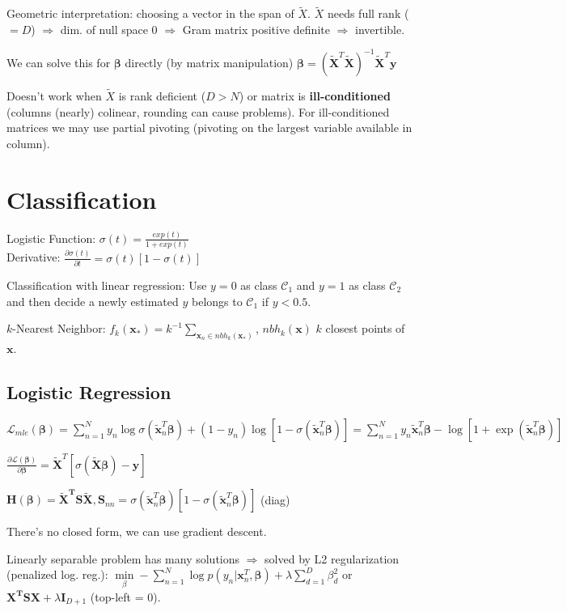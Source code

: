 \documentclass[10pt,a4paper,landscape]{extarticle}
\renewcommand{\bf}[1]{\ensuremath{\mathbf{#1}}}
\newcommand{\bbeta}{\boldsymbol\beta}
\begin{document}
\begin{multicols*}{4}
Geometric interpretation: choosing a vector in the span of $\tilde{X}$. $\tilde{X}$ needs full rank ($=D$) $\Rightarrow$ dim. of null space 0 $\Rightarrow$ Gram matrix positive definite $\Rightarrow$ invertible.

We can solve this for $\bbeta$ directly (by matrix manipulation)
$\bbeta = ( \bf{\tilde{X}}^T \bf{\tilde{X}} )^{-1} \bf{\tilde{X}}^T \bf{y}$

Doesn't work when $\tilde{X}$ is rank deficient ($D>N$) or matrix is \textbf{ill-conditioned} (columns (nearly) colinear, rounding can cause problems). For ill-conditioned matrices we may use partial pivoting (pivoting on the largest variable available in column).

\section{Classification}
Logistic Function: $\sigma(t) = \frac{exp(t)}{1+exp(t)}$\\
Derivative: $\frac{ \partial\sigma(t) }{ \partial t } = \sigma(t)[ 1 - \sigma(t) ]$

Classification with linear regression: Use $y = 0$ as class $\mathcal{C}_1$
and $y = 1$ as class $\mathcal{C}_2$ and then decide a newly estimated $y$ belongs
to $\mathcal{C}_1$ if $y < 0.5$.

$k$-Nearest Neighbor: $f_k(\bf{x}_*) = k^{-1} \sum_{\bf{x}_n \in nbh_k (\bf{x}_*)}$, $nbh_k (\bf{x})$ $k$ closest points of $\bf{x}$.

\subsection{Logistic Regression}
$\mathcal{L}_{mle}(\bbeta) = \sum\limits_{n=1}^N y_n \log \sigma(\tilde{\bf{x}}_n^T \bbeta) + (1-y_n) \log[1-\sigma(\tilde{\bf{x}}_n^T \bbeta)]
= \sum\limits_{n=1}^N y_n \tilde{\bf{x}}_n^T \bbeta - \log[1 + \exp(\tilde{\bf{x}}_n^T \bbeta)]$

$\frac{ \partial\mathcal{L}(\bbeta) }{ \partial \bbeta } = \tilde{\bf{X}}^T [\sigma(\tilde{\bf{X}} \bbeta) - \bf{y}]$

$\bf{H}(\bbeta) = \bf{\tilde{X}^T S \tilde{X}}, \bf{S}_{nn} = \sigma(\bf{\tilde{x}}_n^T \bbeta) [1 - \sigma(\bf{\tilde{x}}_n^T \bbeta)]$ (diag)

There's no closed form, we can use gradient descent.

Linearly separable problem has many solutions $\Rightarrow$ solved by L2 regularization (penalized log. reg.): $\min\limits_\beta -\sum\limits_{n=1}^N \log p(y_n | \bf{x}_n^T, \bbeta) + \lambda \sum\limits_{d=1}^D\beta^2_d$ or $\bf{X^T S X} + \lambda \bf{I}_{D+1}$ (top-left = 0).


\end{multicols*}
\end{document}
